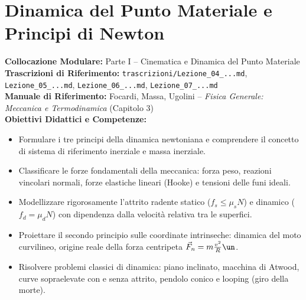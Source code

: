 \chapter{Dinamica del Punto Materiale e Principi di Newton}
\label{chap:dinamica_punto}

\begin{tcolorbox}[enhanced, breakable, colback=navyblue!4!white, colframe=navyblue!80!black,
    coltitle=white, fonttitle=\bfseries\sffamily, title={Quadro Sinottico del Capitolo 03 (Corrispondenza: Lezioni 04, 05, 06 e 07)},
    sharp corners, rounded corners=south, boxrule=1pt]
\textbf{Collocazione Modulare:} Parte I -- Cinematica e Dinamica del Punto Materiale\\
\textbf{Trascrizioni di Riferimento:} \texttt{trascrizioni/Lezione\_04\_...md}, \texttt{Lezione\_05\_...md}, \texttt{Lezione\_06\_...md}, \texttt{Lezione\_07\_...md}\\
\textbf{Manuale di Riferimento:} Focardi, Massa, Ugolini -- \emph{Fisica Generale: Meccanica e Termodinamica} (Capitolo 3)\\
\textbf{Obiettivi Didattici e Competenze:}\par
\begin{itemize}
    \item Formulare i tre principi della dinamica newtoniana e comprendere il concetto di sistema di riferimento inerziale e massa inerziale.
    \item Classificare le forze fondamentali della meccanica: forza peso, reazioni vincolari normali, forze elastiche lineari (Hooke) e tensioni delle funi ideali.
    \item Modellizzare rigorosamente l'attrito radente statico ($f_s \le \mu_s N$) e dinamico ($f_d = \mu_d N$) con dipendenza dalla velocità relativa tra le superfici.
    \item Proiettare il secondo principio sulle coordinate intrinseche: dinamica del moto curvilineo, origine reale della forza centripeta $\vec{F}_n = m \frac{v^2}{R}\un$.
    \item Risolvere problemi classici di dinamica: piano inclinato, macchina di Atwood, curve sopraelevate con e senza attrito, pendolo conico e looping (giro della morte).
\end{itemize}
\end{tcolorbox}

